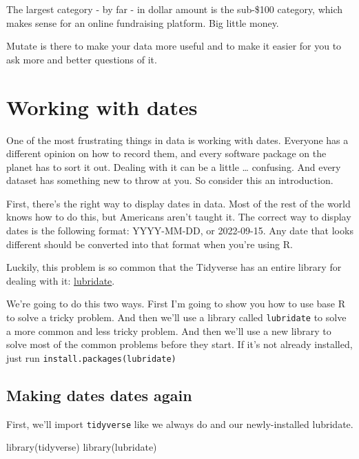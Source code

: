 \documentclass[
  letterpaper,
  DIV=11,
  numbers=noendperiod]{scrreprt}
\newenvironment{Shaded}{\begin{snugshade}}{\end{snugshade}}
\newcommand{\FunctionTok}[1]{\textcolor[rgb]{0.28,0.35,0.67}{#1}}
\newcommand{\NormalTok}[1]{\textcolor[rgb]{0.00,0.23,0.31}{#1}}
\begin{document}
The largest category - by far - in dollar amount is the sub-\$100
category, which makes sense for an online fundraising platform. Big
little money.

Mutate is there to make your data more useful and to make it easier for
you to ask more and better questions of it.


\hypertarget{working-with-dates}{%
\chapter{Working with dates}\label{working-with-dates}}

One of the most frustrating things in data is working with dates.
Everyone has a different opinion on how to record them, and every
software package on the planet has to sort it out. Dealing with it can
be a little \ldots{} confusing. And every dataset has something new to
throw at you. So consider this an introduction.

First, there's the right way to display dates in data. Most of the rest
of the world knows how to do this, but Americans aren't taught it. The
correct way to display dates is the following format: YYYY-MM-DD, or
2022-09-15. Any date that looks different should be converted into that
format when you're using R.

Luckily, this problem is so common that the Tidyverse has an entire
library for dealing with it:
\href{https://lubridate.tidyverse.org/}{lubridate}.

We're going to do this two ways. First I'm going to show you how to use
base R to solve a tricky problem. And then we'll use a library called
\texttt{lubridate} to solve a more common and less tricky problem. And
then we'll use a new library to solve most of the common problems before
they start. If it's not already installed, just run
\texttt{install.packages(\textquotesingle{}lubridate\textquotesingle{})}

\hypertarget{making-dates-dates-again}{%
\section{Making dates dates again}\label{making-dates-dates-again}}

First, we'll import \texttt{tidyverse} like we always do and our
newly-installed lubridate.

\begin{Shaded}
\begin{Highlighting}[]
\FunctionTok{library}\NormalTok{(tidyverse)}
\FunctionTok{library}\NormalTok{(lubridate)}
\end{Highlighting}
\end{Shaded}
\end{document}
